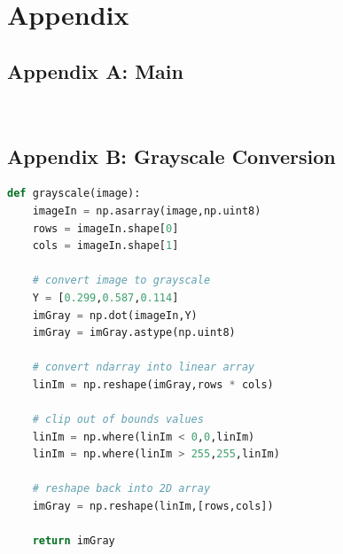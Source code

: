 \documentclass[11pt,a4paper]{article}
\begin{document}
\pagebreak

\section{Appendix}

\subsection{Appendix A: Main} \label{app:main}
	\begin{lstlisting}[language=Python,label={lst:main}]
	
	\end{lstlisting}
	
\subsection{Appendix B: Grayscale Conversion} \label{app:gray}
	\begin{lstlisting}[language=Python,label={lst:gray}]
def grayscale(image):
    imageIn = np.asarray(image,np.uint8)
    rows = imageIn.shape[0]
    cols = imageIn.shape[1]

    # convert image to grayscale
    Y = [0.299,0.587,0.114]
    imGray = np.dot(imageIn,Y)
    imGray = imGray.astype(np.uint8)

    # convert ndarray into linear array
    linIm = np.reshape(imGray,rows * cols)

    # clip out of bounds values
    linIm = np.where(linIm < 0,0,linIm)
    linIm = np.where(linIm > 255,255,linIm)

    # reshape back into 2D array
    imGray = np.reshape(linIm,[rows,cols])

    return imGray
	\end{lstlisting}
	
\end{document}
